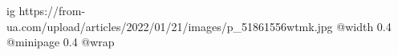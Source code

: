 
 
 
 
 

\ifcmt
  ig https://from-ua.com/upload/articles/2022/01/21/images/p_51861556wtmk.jpg
  @width 0.4
  @minipage 0.4
  @wrap \parpic[r]
\fi
